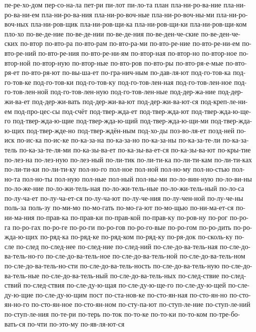{пе-ре-хо-дом
пер-со-на-ла
пет-ри
пи-лот
пи-ло-та
план
пла-ни-ро-ва-ние
пла-ни-ро-ва-ни-ем
пла-ни-ро-ва-ния
пла-ни-ро-воч-ные
пла-ни-ро-воч-ны-ми
пла-ни-ро-воч-ных
пла-ни-ров-щик
пла-ни-ров-щи-ка
пла-ни-ров-щи-ки
пла-ни-ров-щи-ком
пло-хо
по-ве-де-ние
по-ве-де-нии
по-ве-де-ния
по-ве-ден-че-ские
по-ве-ден-че-ских
по-втор
по-вто-ра
по-вто-рам
по-вто-ра-ми
по-вто-ре-ние
по-вто-ре-ни-ем
по-вто-ре-ний
по-вто-ре-ния
по-вто-ре-ни-ям
по-втор-ная
по-втор-но
по-втор-ное
по-втор-ной
по-втор-ную
по-втор-ные
по-вто-ров
по-вто-ры
по-вто-ря-е-мые
по-вто-ря-ет
по-вто-ря-ют
по-вы-ша-ет
по-гра-нич-ным
по-дав-ля-ют
под-го-тов-ка
под-го-тов-ке
под-го-тов-ки
под-го-тов-ку
под-го-тов-лен-ная
под-го-тов-лен-ное
под-го-тов-лен-ной
под-го-тов-лен-ную
под-го-тов-лен-ные
под-дер-жа-ние
под-дер-жи-ва-ет
под-дер-жи-вать
под-дер-жи-ва-ют
под-дер-жи-ва-ют-ся
под-креп-ле-ни-ем
под-про-цес-сы
под-счёт
под-твер-жда-ет
под-твер-жда-ют
под-твер-жда-ю-ще-го
под-твер-жда-ю-щие
под-твер-жда-ю-щий
под-твер-жда-ю-щи-ми
под-твер-жда-ю-щих
под-твер-жде-но
под-твер-ждён-ным
под-хо-ды
поз-во-ля-ет
позд-ней
по-иск
по-ис-ка
по-ис-ке
по-ка-за-на
по-ка-за-но
по-ка-за-ны
по-ка-за-те-ли
по-ка-за-тель
по-ка-за-те-ля-ми
по-ка-зы-ва-ет
по-ка-зы-ва-ет-ся
по-ка-зы-ва-ют
по-кры-тие
по-лез-на
по-лез-ную
по-лез-ный
по-ли-тик
по-ли-ти-ка
по-ли-ти-кам
по-ли-ти-ках
по-ли-ти-ки
по-ли-ти-ку
пол-но-го
пол-ное
пол-ной
пол-но-му
пол-но-стью
пол-но-та
пол-но-ты
пол-ную
пол-ные
пол-ный
пол-ны-ми
по-ло-вин-ную
по-ло-ви-ны
по-ло-же-ние
по-ло-жи-тель-ная
по-ло-жи-тель-ные
по-ло-жи-тель-ный
по-ло-са
по-лу-ча-ет
по-лу-ча-ет-ся
по-лу-ча-ют
по-лу-че-ния
по-лу-чен-ной
по-лу-че-ны
поль-за
поль-зу
по-ми-мо
по-мо-гать
по-мо-га-ют
по-мо-щью
по-ни-ма-ет-ся
по-ни-ма-ния
по-прав-ка
по-прав-ки
по-прав-кой
по-прав-ку
по-ров-ну
по-рог
по-ро-га
по-ро-гах
по-ро-ге
по-ро-ги
по-ро-гов
по-ро-го-вые
по-ро-гом
по-ро-дить
по-ро-жда-ю-щих
по-ряд-ка
по-ряд-ке
по-ряд-ком
по-ряд-ку
по-ря-док
по-сколь-ку
по-сле
по-след
по-след-нее
по-след-ние
по-след-ний
по-сле-до-ва-тель-ная
по-сле-до-ва-тель-но-го
по-сле-до-ва-тель-ное
по-сле-до-ва-тель-ной
по-сле-до-ва-тель-ном
по-сле-до-ва-тель-но-сти
по-сле-до-ва-тель-ность
по-сле-до-ва-тель-ную
по-сле-до-ва-тель-ные
по-сле-до-ва-тель-ный
по-сле-до-ва-тель-ных
по-след-ствие
по-след-ствий
по-след-ствия
по-сле-ду-ю-щая
по-сле-ду-ю-ще-го
по-сле-ду-ю-щей
по-сле-ду-ю-щие
по-сле-ду-ю-щим
пост
по-ста-нов-ке
по-сто-ян-ная
по-сто-ян-но
по-сто-ян-но-го
по-сто-ян-ное
по-сто-ян-ном
по-сту-па-ют
по-ступ-ле-ние
по-ступ-ле-ний
по-ступ-ле-ния
по-те-ри
по-терь
по-ток
по-то-ке
по-то-ки
по-то-ком
по-тре-бо-вать-ся
по-чти
по-это-му
по-яв-ля-ют-ся
}
